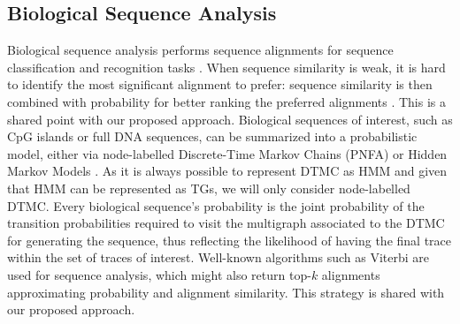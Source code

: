 

\subsection{Biological Sequence Analysis}
Biological sequence analysis performs sequence alignments for sequence classification and recognition tasks \cite{durbin1998biological}. When sequence similarity is weak, it is hard to identify the most significant alignment to prefer: sequence similarity is then combined with probability for better ranking the preferred alignments \cite{durbin1998biological}. This is a shared point with our proposed approach. 
%
Biological sequences of interest, such as CpG islands or full DNA sequences, can be summarized into a probabilistic model, either via node-labelled Discrete-Time Markov Chains (PNFA) \cite{RyabkoU08} or Hidden Markov Models \cite{Helske2018}. As it is always possible to represent DTMC as HMM \cite{DUPONT20051349} and given that HMM can be represented as TGs, we will only consider node-labelled DTMC. %
Every biological sequence's probability is the joint probability of the transition probabilities required to visit the multigraph associated to the DTMC for generating the sequence, thus %
reflecting the likelihood of having the final trace within the set of traces of interest. 
%
Well-known algorithms such as Viterbi are used for sequence analysis, which might also return top-$k$ alignments \cite{577040} approximating probability and alignment similarity.
This strategy is shared with our proposed approach. 
